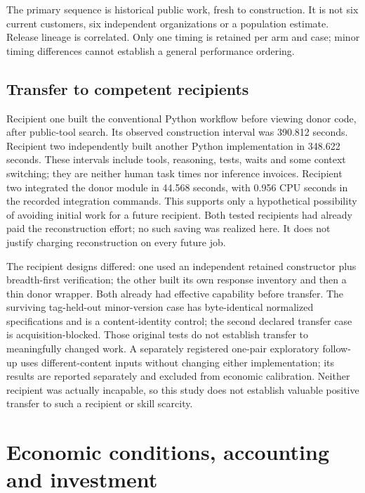 \documentclass[11pt,letterpaper]{article}
\begin{document}
The primary sequence is historical public work, fresh to construction. It is not six current
customers, six independent organizations or a population estimate. Release lineage is correlated.
Only one timing is retained per arm and case; minor timing differences cannot establish a
general performance ordering.



\subsection{Transfer to competent recipients}

Recipient one built the conventional Python workflow before viewing donor code, after public-tool
search. Its observed construction interval was 390.812 seconds. Recipient two independently
built another Python implementation in 348.622 seconds. These intervals include tools, reasoning,
tests, waits and some context switching; they are neither human task times nor inference invoices.
Recipient two integrated the donor module in 44.568 seconds, with 0.956 CPU seconds in the
recorded integration commands. This supports only a hypothetical possibility of avoiding
initial work for a future recipient. Both tested recipients had already paid the reconstruction
effort; no such saving was realized here. It does not justify charging reconstruction on every future job.



The recipient designs differed: one used an independent retained constructor plus breadth-first
verification; the other built its own response inventory and then a thin donor wrapper.
Both already had effective capability before transfer. The surviving tag-held-out minor-version case
has byte-identical normalized specifications and is a content-identity control; the second declared
transfer case is acquisition-blocked. Those original tests do not establish transfer to
meaningfully changed work. A separately registered one-pair exploratory follow-up uses
different-content inputs without changing either implementation; its results are reported
separately and excluded from economic calibration. Neither recipient was actually incapable,
so this study does not establish valuable positive transfer to such a recipient or skill scarcity.

\section{Economic conditions, accounting and investment}
\end{document}
